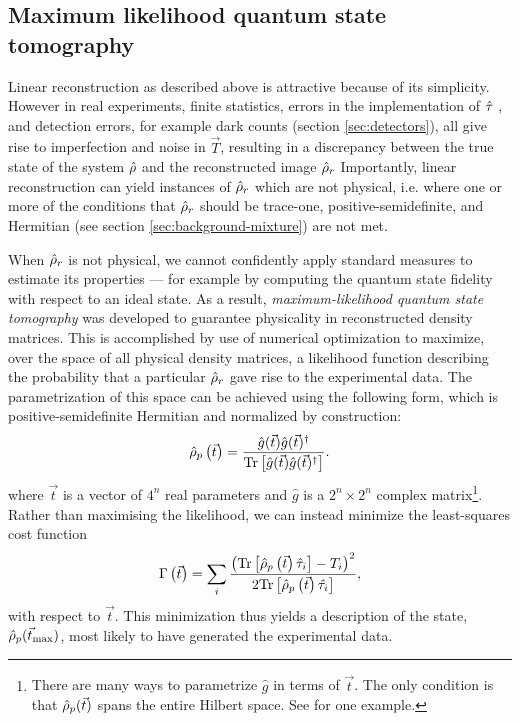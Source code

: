 \subsection{Maximum likelihood quantum state tomography}

Linear reconstruction as described above is attractive because of its simplicity. 
However in real experiments, finite statistics, errors in the implementation of $\hat{\tau}$ \cite{LangfordThesis}, and detection errors, for example dark counts (section \ref{sec:detectors}), all give rise to imperfection and noise in $\vec{T}$, resulting in a discrepancy between the true state of the system $\hat{\rho}$ and the reconstructed image $\hat{\rho}_r$  Importantly, linear reconstruction can yield instances of $\hat{\rho}_r$ which are not physical, i.e. where one or more of the conditions that $\hat{\rho}_r$ should be trace-one, positive-semidefinite, and Hermitian (see section \ref{sec:background-mixture}) are not met.  

When $\hat{\rho}_r$ is not physical, we cannot confidently apply standard measures to estimate its properties --- for example by computing the quantum state fidelity with respect to an ideal state. As a result, \emph{maximum-likelihood quantum state tomography} \cite{James2001} was developed to guarantee physicality in reconstructed density matrices.
This is accomplished by use of numerical optimization to maximize, over the space of all physical density matrices, a likelihood function describing the probability that a particular $\hat{\rho}_r$ gave rise to the experimental data. The parametrization of this space can be achieved using the following form, which is positive-semidefinite Hermitian and normalized by construction:
\begin{equation}
\hat{\rho}_{p}\left( \vec{t} \right) = \frac{\hat{g}(\vec{t}) \hat{g}(\vec{t})^{\dagger}} {\textrm{Tr} \left[ \hat{g}(\vec{t}) \hat{g}(\vec{t})^{\dagger} \right]}.
\label{eqn:physical-mixed-state}
\end{equation}
where $\vec{t}$ is a vector of 
$4^n$ 
real parameters and $\hat{g}$ is a $2^n \times 2^n$ complex matrix\footnote{There are many ways to parametrize $\hat{g}$ in terms of $\vec{t}$. The only condition is that $\hat{\rho}_p(\vec{t})$ spans the entire Hilbert space. See \cite{James2001} for one example.}.
Rather than maximising the likelihood, we can instead minimize the least-squares cost function 
\begin{equation}
    \Gamma \left( \vec{t} \right) = 
    \sum_i 
    \frac
    { \left( \mathrm{Tr}\left[ \hat{\rho}_p \left( \vec{t} \right) \hat{\tau}_i \right] - T_i \right)^2 }
    { 2 \mathrm{Tr} \left[ \hat{\rho}_p \left( \vec{t} \right) \hat{\tau_i} \right] }
    \label{eqn:ml_cost},
\end{equation}
with respect to $\vec{t}$. This minimization thus yields a description of the state, $\hat{\rho}_p(\vec{t}_\mathrm{max})$, most likely to have generated the experimental data.

